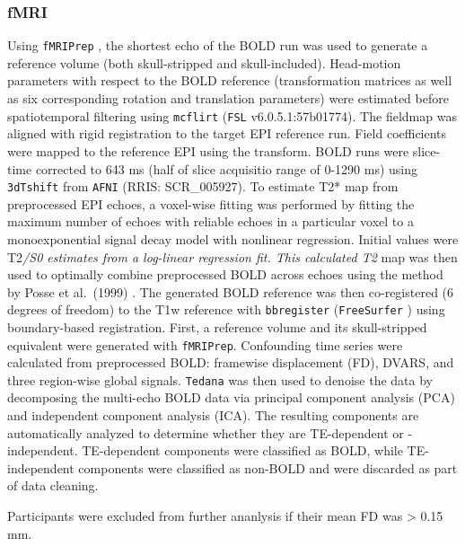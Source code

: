 \documentclass[
true
]{sn-jnl}
\begin{document}
\subsubsection{fMRI}\label{fmri}

Using \texttt{fMRIPrep} \citep{estebanFMRIPrepRobustPreprocessing2019},
the shortest echo of the BOLD run was used to generate a reference
volume (both skull-stripped and skull-included). Head-motion parameters
with respect to the BOLD reference (transformation matrices as well as
six corresponding rotation and translation parameters) were estimated
before spatiotemporal filtering using \texttt{mcflirt}
\citep{jenkinsonImprovedOptimizationRobust2002} (\texttt{FSL}
v6.0.5.1:57b01774). The fieldmap was aligned with rigid registration to
the target EPI reference run. Field coefficients were mapped to the
reference EPI using the transform. BOLD runs were slice-time corrected
to 643 ms (half of slice acquisitio range of 0-1290 ms) using
\texttt{3dTshift} from \texttt{AFNI} \citep{coxAFNISoftwareAnalysis1996}
(RRIS: SCR\_005927). To estimate T2* map from preprocessed EPI echoes, a
voxel-wise fitting was performed by fitting the maximum number of echoes
with reliable echoes in a particular voxel to a monoexponential signal
decay model with nonlinear regression. Initial values were T2\emph{/S0
estimates from a log-linear regression fit. This calculated T2} map was
then used to optimally combine preprocessed BOLD across echoes using the
method by Posse et al.~(1999)
\citep{posseEnhancementBOLDcontrastSensitivity1999}. The generated BOLD
reference was then co-registered (6 degrees of freedom) to the T1w
reference with \texttt{bbregister} (\texttt{FreeSurfer}
\citep{daleCorticalSurfacebasedAnalysis1999}) using boundary-based
registration. First, a reference volume and its skull-stripped
equivalent were generated with \texttt{fMRIPrep}. Confounding time
series were calculated from preprocessed BOLD: framewise displacement
(FD), DVARS, and three region-wise global signals. \texttt{Tedana}
\citep{dupreTEdependentAnalysisMultiecho2021} was then used to denoise
the data by decomposing the multi-echo BOLD data via principal component
analysis (PCA) and independent component analysis (ICA). The resulting
components are automatically analyzed to determine whether they are
TE-dependent or -independent. TE-dependent components were classified as
BOLD, while TE-independent components were classified as non-BOLD and
were discarded as part of data cleaning.

Participants were excluded from further ananlysis if their mean FD was
\textgreater{} 0.15 mm.
\end{document}
